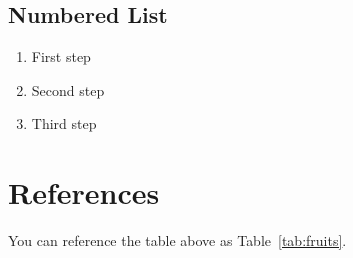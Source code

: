 \documentclass{article}
\begin{document}
\subsection{Numbered List}
\begin{enumerate}
    \item First step
    \item Second step
    \item Third step
\end{enumerate}

\section{References}
You can reference the table above as Table~\ref{tab:fruits}.
\end{document}
